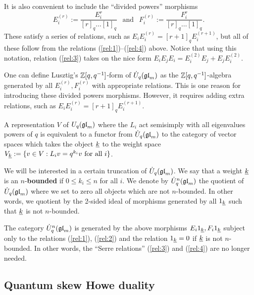 \documentclass[11pt,leqno]{article}
\begin{document}
It is also convenient to include the ``divided powers'' morphisms
$$E_i^{(r)} := \frac{E_i^r}{[r]_q \dots [1]_q} \ \ \text{ and } \ \ F_i^{(r)} := \frac{F_i^r}{[r]_q \dots [1]_q}.$$
These satisfy a series of relations, such as $E_i E_i^{(r)} = [r+1]_q E_i^{(r+1)}$, but all of these follow from the relations (\ref{rel:1})--(\ref{rel:4}) above. Notice that using this notation, relation (\ref{rel:3}) takes on the nice form $E_iE_jE_i = E_i^{(2)}E_j + E_jE_i^{(2)}$.

\begin{rem}
One can define Lusztig's ${\mathbb{Z}}[q, q^{-1}]$-form of $ \dot{{{U}}}_q({\mathfrak{gl}}_m) $ as the $ {\mathbb{Z}}[q,q^{-1}]$-algebra generated by all $ E_i^{(r)}, F_i^{(r)} $ with appropriate relations. This is one reason for introducing these divided powers morphisms. However, it requires adding extra relations, such as $E_i E_i^{(r)} = [r+1]_q E_i^{(r+1)}$.  
\end{rem}

A representation $ V $ of $ U_q({\mathfrak{gl}}_m) $ where the $ L_i $ act semisimply with all eigenvalues powers of $ q $ is equivalent to a functor from $ \dot{{{U}}}_q({\mathfrak{gl}}_m) $ to the category of vector spaces which takes the object $ {\underline{k}} $ to the weight space $ V_{{\underline{k}}} := \{ v \in V : L_i v = q^{k_i} v \text{ for all } i \} $. 

We will be interested in a certain truncation of $ \dot{{{U}}}_q({\mathfrak{gl}}_m) $.  We say that a weight $ {\underline{k}} $ is an $n$-\textbf{bounded} if $ 0 \le k_i \le n $ for all $ i$.  We denote by $\dot{{{U}}}_q^n({\mathfrak{gl}}_m)$ the quotient of $\dot{{{U}}}_q({\mathfrak{gl}}_m)$ where we set to zero all objects which are not $n$-bounded. In other words, we quotient by the 2-sided ideal of morphisms generated by all $ 1_{{\underline{k}}} $ such that $ {\underline{k}} $ is not $ n$-bounded.

\begin{prop} \label{th:quotientrelations}
The category $ \dot{{{U}}}_q^n({\mathfrak{gl}}_m) $ is generated by the above morphisms $ E_i 1_{{\underline{k}}}, F_i 1_{{\underline{k}}} $ subject only to the relations (\ref{rel:1}), (\ref{rel:2}) and the relation $ 1_{{\underline{k}}} = 0 $ if $ {\underline{k}} $ is not $ n$-bounded. In other words, the ``Serre relations'' (\ref{rel:3}) and (\ref{rel:4}) are no longer needed.
\end{prop}


\subsection{Quantum skew Howe duality}
\end{document}
